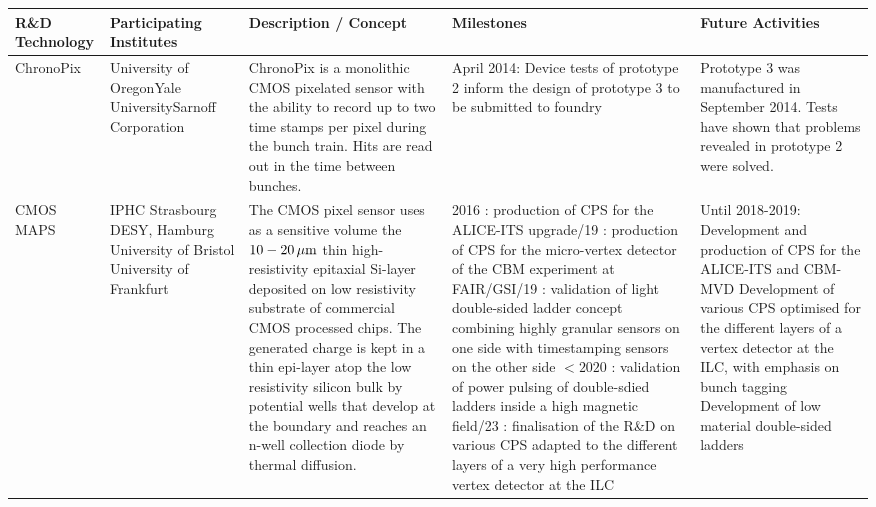 \thispagestyle{empty}
\begin{landscape}
    \centering
    \begin{adjustbox}{max width=1.1\textwidth,totalheight=1\textheight}
\begin{tabularx}{2\textheight}{lXXXX}
    \toprule
    R\&D Technology & Participating Institutes & Description / Concept & Milestones & Future Activities \\
    \midrule
        ChronoPix &
        University of Oregon\newline Yale University\newline Sarnoff Corporation &
        ChronoPix is a monolithic CMOS pixelated sensor with the ability to record up to two time stamps per pixel during the bunch train. Hits are read out in the time between bunches. &
        April 2014: Device tests of prototype 2 inform the design of prototype 3 to be submitted to foundry &
        Prototype 3 was manufactured in September 2014. Tests have shown that problems revealed in prototype 2 were solved. \\
    \midrule
        CMOS MAPS &
        IPHC Strasbourg \newline DESY, Hamburg \newline University of Bristol \newline University of Frankfurt &
        The CMOS pixel sensor uses as a sensitive volume the $\unit[10-20]{\micron}$ thin high-resistivity epitaxial Si-layer deposited on low resistivity substrate of commercial CMOS processed chips. The generated charge is kept in a thin epi-layer atop the low resistivity silicon bulk by potential wells that develop at the boundary and reaches an n-well collection diode by thermal diffusion. &
        2016 : production of CPS for the ALICE-ITS upgrade\newline
        2018/19 : production of CPS for the micro-vertex detector of the CBM experiment at FAIR/GSI\newline
        2018/19 : validation of light double-sided ladder concept combining highly granular sensors on one side with timestamping sensors on the other side\newline
        $< 2020$ : validation of power pulsing of double-sdied ladders inside a high magnetic field\newline
        2022/23 : finalisation of the R\&D on various CPS adapted to the different layers of a very high performance vertex detector at the ILC &
        Until 2018-2019: Development and production of CPS for the ALICE-ITS and CBM-MVD \newline Development of various CPS optimised for the different layers of a vertex detector at the ILC, with emphasis on bunch tagging \newline Development of low material double-sided ladders \\

\end{tabularx}
\end{adjustbox}
\end{landscape}
